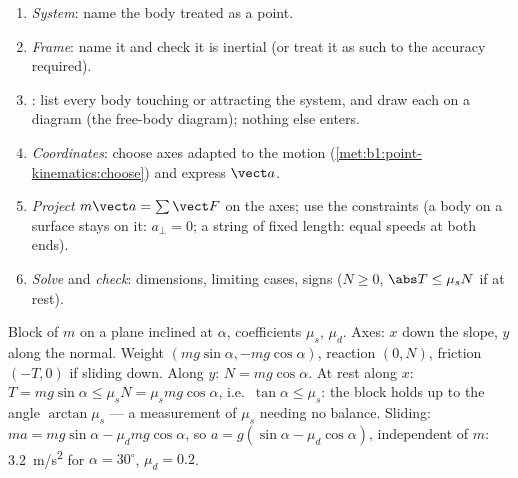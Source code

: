 \begin{method}\label{met:b1:newton-dynamics:method}
\begin{enumerate}
  \item \emph{System}: name the body treated as a point.
  \item \emph{Frame}: name it and check it is inertial (or treat it as
        such to the accuracy required).
  \item \emph{}: list every body touching or attracting the
        system, and draw each  on a diagram (the free-body
        diagram); nothing else enters.
  \item \emph{Coordinates}: choose axes adapted to the motion
        (\cref{met:b1:point-kinematics:choose}) and express $\vect a$.
  \item \emph{Project} $m\vect a = \sum\vect F$ on the axes; use the
        constraints (a body on a surface stays on it: $a_\perp = 0$; a
        string of fixed length: equal speeds at both ends).
  \item \emph{Solve} and \emph{check}: dimensions, limiting cases,
        signs ($N \geq 0$, $\abs T \leq \mu_sN$ if at rest).
\end{enumerate}
\end{method}

\begin{example}\label{ex:b1:newton-dynamics:incline}
Block of  $m$ on a plane inclined at $\alpha$, coefficients $\mu_s$,
$\mu_d$. Axes: $x$ down the slope, $y$ along the normal. Weight
$(mg\sin\alpha, -mg\cos\alpha)$, reaction $(0, N)$, friction $(-T, 0)$
if sliding down. Along $y$: $N = mg\cos\alpha$. At rest along $x$:
$T = mg\sin\alpha \leq \mu_sN = \mu_smg\cos\alpha$, i.e.\ $\tan\alpha
\leq \mu_s$: the block holds up to the angle $\arctan\mu_s$ --- a
measurement of $\mu_s$ needing no balance. Sliding: $ma = mg\sin\alpha -
\mu_dmg\cos\alpha$, so $a = g(\sin\alpha - \mu_d\cos\alpha)$, independent
of $m$: \qty{3.2}{m/s^2} for $\alpha = 30^\circ$, $\mu_d = 0.2$.
\end{example}

